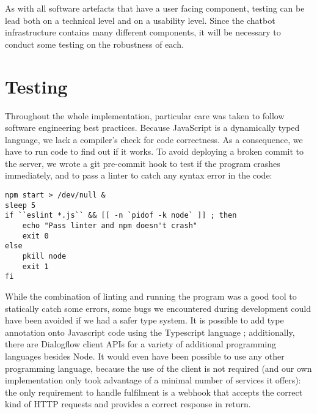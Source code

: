 As with all software artefacts that have a user facing component, testing can be lead both on a technical level and on a usability level. Since the chatbot infrastructure contains many different components, it will be necessary to conduct some testing on the robustness of each.
\section{Testing}
Throughout the whole implementation, particular care was taken to follow software engineering best practices. Because JavaScript is a dynamically typed language, we lack a compiler's check for code correctness. As a consequence, we have to run code to find out if it works. To avoid deploying a broken commit to the server, we wrote a git pre-commit hook to test if the program crashes immediately, and to pass a linter to catch any syntax error in the code:
\begin{lstlisting}
npm start > /dev/null &
sleep 5
if ``eslint *.js`` && [[ -n `pidof -k node` ]] ; then
    echo "Pass linter and npm doesn't crash"
    exit 0
else
    pkill node
    exit 1
fi
\end{lstlisting}
While the combination of linting and running the program was a good tool to statically catch some errors, some bugs we encountered during development could have been avoided if we had a safer type system. It is possible to add type annotation onto Javascript code using the Typescript language \cite{typescript}; additionally, there are Dialogflow client APIs for a variety of additional programming languages besides Node. It would even have been possible to use any other programming language, because the use of the client is not required (and our own implementation only took advantage of a minimal number of services it offers): the only requirement to handle fulfilment is a webhook that accepts the correct kind of HTTP requests and provides a correct response in return. 

